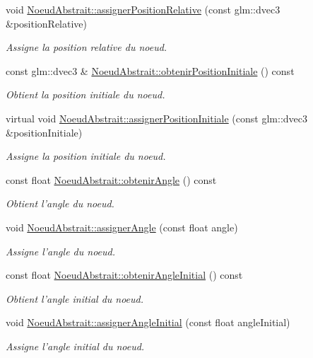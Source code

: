 \begin{DoxyCompactItemize}
void \hyperlink{group__inf2990_ga11e12e42b05a5327c92cd7fd1b7e5a24}{Noeud\-Abstrait\-::assigner\-Position\-Relative} (const glm\-::dvec3 \&position\-Relative)
\begin{DoxyCompactList}\small\item\em Assigne la position relative du noeud. \end{DoxyCompactList}\item 
const glm\-::dvec3 \& \hyperlink{group__inf2990_ga5e57e4e6ac1df01d25098fbeb7fcc56d}{Noeud\-Abstrait\-::obtenir\-Position\-Initiale} () const 
\begin{DoxyCompactList}\small\item\em Obtient la position initiale du noeud. \end{DoxyCompactList}\item 
virtual void \hyperlink{group__inf2990_ga18ba04a32eaa8942418950a647e5e717}{Noeud\-Abstrait\-::assigner\-Position\-Initiale} (const glm\-::dvec3 \&position\-Initiale)
\begin{DoxyCompactList}\small\item\em Assigne la position initiale du noeud. \end{DoxyCompactList}\item 
const float \hyperlink{group__inf2990_ga9f5f0864e56b552efe95e693c198a3b4}{Noeud\-Abstrait\-::obtenir\-Angle} () const 
\begin{DoxyCompactList}\small\item\em Obtient l'angle du noeud. \end{DoxyCompactList}\item 
void \hyperlink{group__inf2990_ga7977957d758ca590a057aa33d76e5e75}{Noeud\-Abstrait\-::assigner\-Angle} (const float angle)
\begin{DoxyCompactList}\small\item\em Assigne l'angle du noeud. \end{DoxyCompactList}\item 
const float \hyperlink{group__inf2990_ga61797fb6a426150891203ea91e3f2cb8}{Noeud\-Abstrait\-::obtenir\-Angle\-Initial} () const 
\begin{DoxyCompactList}\small\item\em Obtient l'angle initial du noeud. \end{DoxyCompactList}\item 
void \hyperlink{group__inf2990_gaf0e7fd3676087b70949012a945000509}{Noeud\-Abstrait\-::assigner\-Angle\-Initial} (const float angle\-Initial)
\begin{DoxyCompactList}\small\item\em Assigne l'angle initial du noeud. \end{DoxyCompactList}\item 

\end{DoxyCompactItemize}
